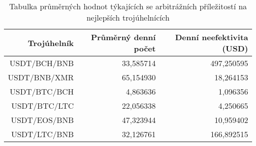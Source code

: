 \begin{table}\centering
\caption{Tabulka průměrných hodnot týkajících se arbitrážních příležitostí na nejlepších trojúhelnících}
\label{table_combined_best}
\begin{tabular}{|| r | r | r ||}\hline Trojúhelník & Průměrný denní počet & Denní neefektivita (USD)\\ [0.5ex]
 \hline\hline USDT/BCH/BNB & 33,585714 & 497,250595\\ 
 \hline USDT/BNB/XMR & 65,154930 & 18,264153\\ 
 \hline USDT/BTC/BCH & 4,863636 & 1,096356\\ 
 \hline USDT/BTC/LTC & 22,056338 & 4,250665\\ 
 \hline USDT/EOS/BNB & 47,323944 & 10,959402\\ 
 \hline USDT/LTC/BNB & 32,126761 & 166,892515\\ 
 \hline
\end{tabular}
\end{table}
